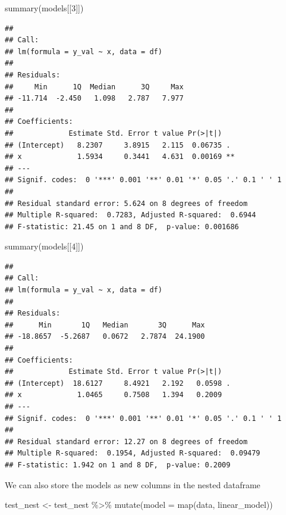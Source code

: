 \documentclass[
]{book}
\newenvironment{Shaded}{\begin{snugshade}}{\end{snugshade}}
\newcommand{\AttributeTok}[1]{\textcolor[rgb]{0.77,0.63,0.00}{#1}}
\newcommand{\DecValTok}[1]{\textcolor[rgb]{0.00,0.00,0.81}{#1}}
\newcommand{\FunctionTok}[1]{\textcolor[rgb]{0.00,0.00,0.00}{#1}}
\newcommand{\NormalTok}[1]{#1}
\newcommand{\OtherTok}[1]{\textcolor[rgb]{0.56,0.35,0.01}{#1}}
\newcommand{\SpecialCharTok}[1]{\textcolor[rgb]{0.00,0.00,0.00}{#1}}
\begin{document}
\begin{Shaded}
\begin{Highlighting}[]
\FunctionTok{summary}\NormalTok{(models[[}\DecValTok{3}\NormalTok{]])}
\end{Highlighting}
\end{Shaded}

\begin{verbatim}
## 
## Call:
## lm(formula = y_val ~ x, data = df)
## 
## Residuals:
##     Min      1Q  Median      3Q     Max 
## -11.714  -2.450   1.098   2.787   7.977 
## 
## Coefficients:
##             Estimate Std. Error t value Pr(>|t|)   
## (Intercept)   8.2307     3.8915   2.115  0.06735 . 
## x             1.5934     0.3441   4.631  0.00169 **
## ---
## Signif. codes:  0 '***' 0.001 '**' 0.01 '*' 0.05 '.' 0.1 ' ' 1
## 
## Residual standard error: 5.624 on 8 degrees of freedom
## Multiple R-squared:  0.7283, Adjusted R-squared:  0.6944 
## F-statistic: 21.45 on 1 and 8 DF,  p-value: 0.001686
\end{verbatim}

\begin{Shaded}
\begin{Highlighting}[]
\FunctionTok{summary}\NormalTok{(models[[}\DecValTok{4}\NormalTok{]])}
\end{Highlighting}
\end{Shaded}

\begin{verbatim}
## 
## Call:
## lm(formula = y_val ~ x, data = df)
## 
## Residuals:
##      Min       1Q   Median       3Q      Max 
## -18.8657  -5.2687   0.0672   2.7874  24.1900 
## 
## Coefficients:
##             Estimate Std. Error t value Pr(>|t|)  
## (Intercept)  18.6127     8.4921   2.192   0.0598 .
## x             1.0465     0.7508   1.394   0.2009  
## ---
## Signif. codes:  0 '***' 0.001 '**' 0.01 '*' 0.05 '.' 0.1 ' ' 1
## 
## Residual standard error: 12.27 on 8 degrees of freedom
## Multiple R-squared:  0.1954, Adjusted R-squared:  0.09479 
## F-statistic: 1.942 on 1 and 8 DF,  p-value: 0.2009
\end{verbatim}

We can also store the models as new columns in the nested dataframe

\begin{Shaded}
\begin{Highlighting}[]
\NormalTok{test\_nest }\OtherTok{\textless{}{-}}\NormalTok{ test\_nest }\SpecialCharTok{\%\textgreater{}\%} 
  \FunctionTok{mutate}\NormalTok{(}\AttributeTok{model =} \FunctionTok{map}\NormalTok{(data, linear\_model))}
\end{Highlighting}
\end{Shaded}
\end{document}
